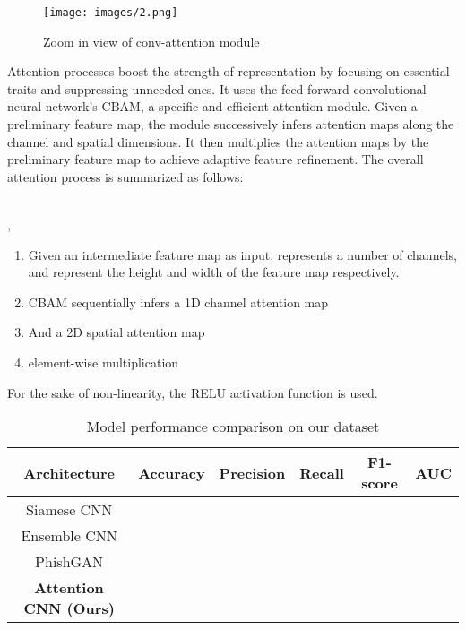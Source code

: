 \documentclass[letterpaper]{article} \usepackage{aaai22}  \usepackage{times}  \usepackage{helvet}  \usepackage{courier}  \usepackage[hyphens]{url}  \usepackage{graphicx} \urlstyle{rm} \def\UrlFont{\rm}  \usepackage{natbib}  \usepackage{caption} \DeclareCaptionStyle{ruled}{labelfont=normalfont,labelsep=colon,strut=off} \frenchspacing  \setlength{\pdfpagewidth}{8.5in}  \setlength{\pdfpageheight}{11in}  \usepackage{algorithm}
\begin{document}
\begin{figure*}[!ht]
  \texttt{[image: images/2.png]}
  \caption{Zoom in view of conv-attention module}
\end{figure*}

Attention processes boost the strength of representation by focusing on essential traits and suppressing unneeded ones. It uses the feed-forward convolutional neural network's CBAM, a specific and efficient attention module. Given a preliminary feature map, the module successively infers attention maps along the channel and spatial dimensions. It then multiplies the attention maps by the preliminary feature map to achieve adaptive feature refinement. The overall attention process is summarized as follows:


\begin{center}
 \\
,
\end{center}
\begin{enumerate}
    \item Given an intermediate feature map  as input.  represents a number of channels,  and  represent the height and width of the feature map  respectively. 
    \item CBAM sequentially infers a 1D channel attention map  
    \item And a 2D spatial attention map  
    \item  element-wise multiplication
\end{enumerate}

For the sake of non-linearity, the RELU activation function is used. 

\begin{table*}[!ht]
    \centering
    \begin{tabular}{|c|c|c|c|c|c|} \hline
         \textbf{Architecture}& \textbf{Accuracy} & \textbf{Precision} & \textbf{Recall} & \textbf{F1-score} & \textbf{AUC}\\ \hline
         Siamese CNN\cite{woodbridge2018detecting} &  &  &  &  & \\ \hline
         Ensemble CNN\cite{majumder2020convolutional} &  &  &  &  & \\ \hline
         PhishGAN\cite{sern2020phishgan} &  &  &  &  & \\ \hline
         \textbf{Attention CNN (Ours)} & \textbf{} & \textbf{} & \textbf{} & \textbf{} & \textbf{}\\ \hline
    \end{tabular}
    \caption{Model performance comparison on our dataset}
    \label{tab:results}
\end{table*} 
\end{document}
